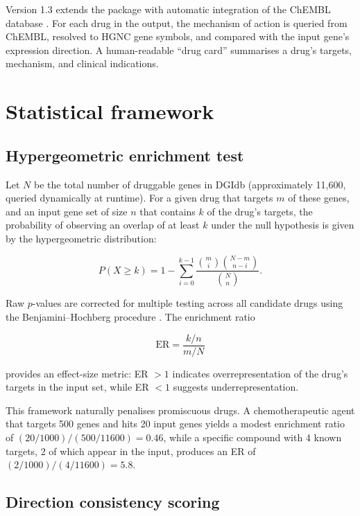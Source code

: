 \documentclass[11pt,a4paper]{article}
\begin{document}
Version 1.3 extends the package with automatic integration of the ChEMBL database \citep{zdrazil2024}. For each drug in the output, the mechanism of action is queried from ChEMBL, resolved to HGNC gene symbols, and compared with the input gene's expression direction. A human-readable ``drug card'' summarises a drug's targets, mechanism, and clinical indications.

\section{Statistical framework}

\subsection{Hypergeometric enrichment test}
\label{sec:enrichment}

Let \(N\) be the total number of druggable genes in DGIdb (approximately 11,600, queried dynamically at runtime). For a given drug that targets \(m\) of these genes, and an input gene set of size \(n\) that contains \(k\) of the drug's targets, the probability of observing an overlap of at least \(k\) under the null hypothesis is given by the hypergeometric distribution:

\[
P(X \geq k) = 1 - \sum_{i=0}^{k-1} \frac{\binom{m}{i}\binom{N-m}{n-i}}{\binom{N}{n}}.
\]

Raw \(p\)-values are corrected for multiple testing across all candidate drugs using the Benjamini--Hochberg procedure \citep{benjamini1995}. The enrichment ratio

\[
\text{ER} = \frac{k/n}{m/N}
\]

provides an effect-size metric: ER \(> 1\) indicates overrepresentation of the drug's targets in the input set, while ER \(< 1\) suggests underrepresentation.

This framework naturally penalises promiscuous drugs. A chemotherapeutic agent that targets 500 genes and hits 20 input genes yields a modest enrichment ratio of \((20/1000) / (500/11600) = 0.46\), while a specific compound with 4 known targets, 2 of which appear in the input, produces an ER of \((2/1000) / (4/11600) = 5.8\).

\subsection{Direction consistency scoring}
\label{sec:direction}
\end{document}
